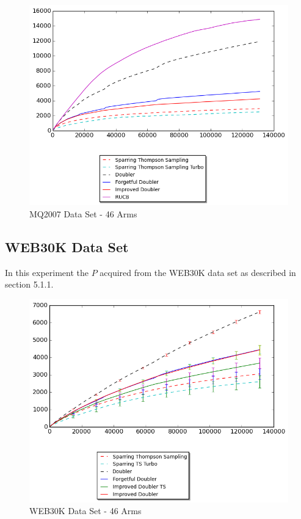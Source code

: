 \documentclass[MSc,beforeExam]{iitcsthesis}
\begin{document}
\newpage
\begin{figure}[h!]
\centering
  \includegraphics[scale=0.8]{graphs/real_data_46.png}
  \caption{MQ2007 Data Set - 46 Arms}
\end{figure}
\newpage
\subsection{WEB30K Data Set}
In this experiment the $P$ acquired from the WEB30K data set as described in section 5.1.1.

\begin{figure}[h!]
\centering
  \includegraphics[scale=0.8]{graphs/preference_real_data_46.png}
  \caption{WEB30K Data Set - 46 Arms}
\end{figure}
\newpage
\end{document}
